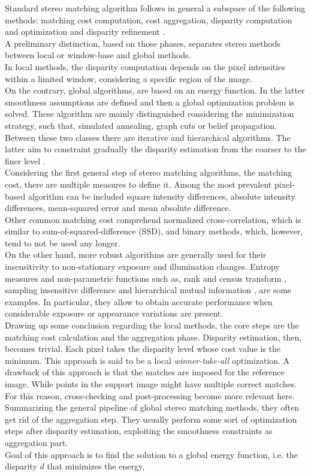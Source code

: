 Standard stereo matching algorithm follows in general a subspace of the following methods: matching cost computation, cost aggregation, disparity computation and optimization and disparity refinement \cite{Scharstein2001}.\\
A preliminary distinction, based on those phases, separates stereo methods between local or window-base and global methods.\\
In local methods, the disparity computation depends on the pixel intensities within a limited window, considering a specific region of the image.\\
On the contrary, global algorithms, are based on an energy function.
In the latter smoothness assumptions are defined and then a global optimization problem is solved. 
These algorithm are mainly distinguished considering the minimization strategy, such that, simulated annealing, graph cuts or belief propagation.\\
Between these two classes there are iterative and hierarchical algorithms. 
The latter aim to constraint gradually the disparity estimation from the coarser to the finer level \cite{Hirschmuller2008}.\\
Considering the first general step of stereo matching algorithms, the matching cost, there are multiple measures to define it.
Among the most prevalent pixel-based algorithm can be included square intensity differences, absolute intensity differences, mean-squared error and mean absolute difference.\\
Other common matching cost comprehend normalized cross-correlation, which is similar to sum-of-squared-difference (SSD), and binary methods, which, however, tend to not be used any longer. \\
On the other hand, more robust algorithms are generally used for their insensitivity to non-stationary exposure and illumination changes. 
Entropy measures and non-parametric functions such as, rank and census transform \cite{Zabih1994}, sampling insensitive difference\cite{Birchfield1999} and hierarchical mutual information \cite{Hirschmuller2008}, are some examples.
In particular, they allow to obtain accurate performance when considerable exposure or appearance variations are present. \\
Drawing up some conclusion regarding the local methods, the core steps are the matching cost calculation and the aggregation phase. 
Disparity estimation, then, becomes trivial. 
Each pixel takes the disparity level whose cost value is the minimum. 
This approach is said to be a local \textit{winner-take-all} optimization. 
A drawback of this approach is that the matches are imposed for the reference image. 
While points in the support image might have multiple correct matches. 
For this reason, cross-checking and post-processing become more relevant here.\\
Summarizing the general pipeline of global stereo matching methods, they often get rid of the aggregation step. 
They usually perform some sort of optimization steps after disparity estimation, exploiting the smoothness constraints as aggregation part. \\
Goal of this approach is to find the solution to a global energy function, i.e. the disparity $d$ that minimizes the energy,


